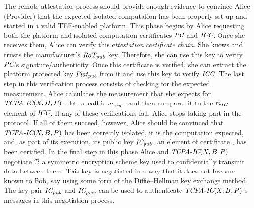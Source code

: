 The remote attestation process should provide enough evidence to convince Alice (Provider) that the expected isolated computation has been properly set up and started in a valid TEE-enabled platform. This phase begins by Alice requesting both the platform and isolated computation certificates $\textit{PC}{}$ and $\textit{ICC}{}$. Once she receives them, Alice can verify this \emph{attestation certificate chain}. She knows and trusts the manufacturer's $\textit{RoT}{}_{\textit{pub}{}}$ key. Therefore, she can use this key to verify $\textit{PC}{}$'s signature/authenticity. Once this certificate is verified, she can extract the platform protected key $\textit{Plat}{}_{\textit{pub}{}}$ from it and use this key to verify $\textit{ICC}$. The last step in this verification process consists of checking for the expected measurement. Alice calculates the measurement that she expects for $\textit{TCPA-IC}(X,B,P)$ - let us call is $m_{exp}$ - and then compares it to the $m_{\textit{IC}{}}$ element of $\textit{ICC}{}$. If any of these verifications fail, Alice stops taking part in the protocol. If all of them succeed, however, Alice should be convinced that $\textit{TCPA-IC}(X,B,P)$ has been correctly isolated, it is the computation expected, and, as part of its execution, its public key $\textit{IC}{}_{\textit{pub}{}}$, an element of certificate \ICC{}, has been certified. In the final step in this phase Alice and $\textit{TCPA-IC}(X,B,P)$ negotiate $T$: a symmetric encryption scheme key used to confidentially transmit data between them. This key is negotiated in a way that it does not become known to Bob, say using some form of the Diffie–Hellman key exchange method. The key pair $\textit{IC}_{\textit{pub}{}}$ and $\textit{IC}_{\textit{priv}{}}$ can be used to authenticate $\textit{TCPA-IC}(X,B,P)$'s messages in this negotiation process. 



